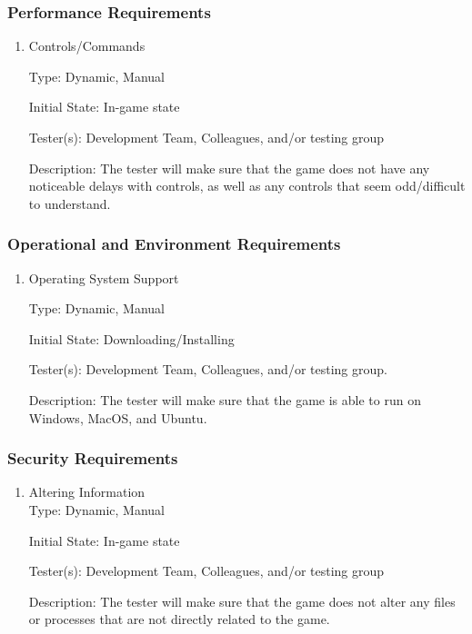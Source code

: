 \documentclass[12pt, titlepage]{article}
\begin{document}
\subsubsection{Performance Requirements}

\begin{enumerate}

\item{Controls/Commands\\}

Type: Dynamic, Manual

Initial State: In-game state

Tester(s): Development Team, Colleagues, and/or testing group

Description: The tester will make sure that the game does not have any noticeable delays with controls, as well as any controls that seem odd/difficult to understand.

\end{enumerate}

\subsubsection{Operational and Environment Requirements}

\begin{enumerate}

\item{Operating System Support\\}

Type: Dynamic, Manual

Initial State: Downloading/Installing

Tester(s): Development Team, Colleagues, and/or testing group.

Description: The tester will make sure that the game is able to run on Windows, MacOS, and Ubuntu.

\end{enumerate}

\subsubsection{Security Requirements}

\begin{enumerate}

\item{Altering Information\\}
Type: Dynamic, Manual

Initial State: In-game state

Tester(s): Development Team, Colleagues, and/or testing group

Description: The tester will make sure that the game does not alter any files or processes that are not directly related to the game.

\end{enumerate}
\end{document}
